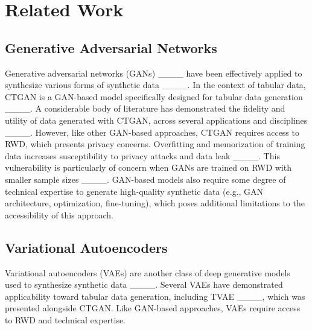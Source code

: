\section{Related Work}
\subsection{Generative Adversarial Networks}
Generative adversarial networks (GANs) ____ have been effectively applied to synthesize various forms of synthetic data ____. In the context of tabular data, CTGAN is a GAN-based model specifically designed for tabular data generation ____. A considerable body of literature has demonstrated the fidelity and utility of data generated with CTGAN, across several applications and disciplines ____. However, like other GAN-based approaches, CTGAN requires access to RWD, which presents privacy concerns. Overfitting and memorization of training data increases susceptibility to privacy attacks and data leak ____. This vulnerability is particularly of concern when GANs are trained on RWD with smaller sample sizes ____. GAN-based models also require some degree of technical expertise to generate high-quality synthetic data (e.g., GAN architecture, optimization, fine-tuning), which poses additional limitations to the accessibility of this approach. 
\subsection{Variational Autoencoders}
Variational autoencoders (VAEs) are another class of deep generative models used to synthesize synthetic data ____. Several VAEs have demonstrated applicability toward tabular data generation, including TVAE ____, which was presented alongside CTGAN. Like GAN-based approaches, VAEs require access to RWD and technical expertise.
